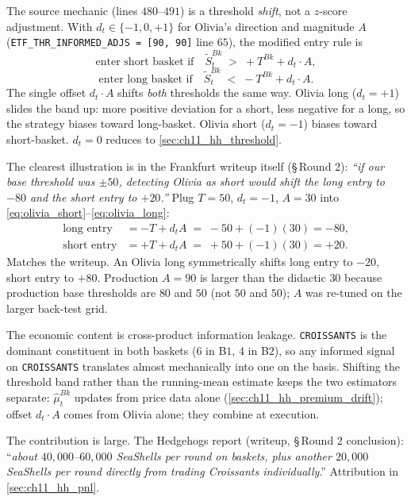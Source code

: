 The source mechanic (lines $480$--$491$) is a threshold
\emph{shift}, not a $z$-score adjustment. With
$d_t \in \{-1, 0, +1\}$ for Olivia's direction and magnitude $A$
(\texttt{ETF\_THR\_INFORMED\_ADJS = [90, 90]} line $65$), the
modified entry rule is
\begin{equation}
  \text{enter short basket if}\quad
    \tilde S^{Bk}_t \;>\; +T^{Bk} + d_t \cdot A,
  \label{eq:olivia_short}
\end{equation}
\begin{equation}
  \text{enter long basket if}\quad
    \tilde S^{Bk}_t \;<\; -T^{Bk} + d_t \cdot A.
  \label{eq:olivia_long}
\end{equation}
The single offset $d_t \cdot A$ shifts \emph{both} thresholds the
same way. Olivia long ($d_t = +1$) slides the band up: more
positive deviation for a short, less negative for a long, so the
strategy biases toward long-basket. Olivia short ($d_t = -1$)
biases toward short-basket. $d_t = 0$ reduces to
\cref{sec:ch11_hh_threshold}.

\begin{prosperitybox}[title={Prosperity example: the Olivia cross-product adjustment}]
\label{prosp:olivia}
The clearest illustration is in the Frankfurt writeup itself
(\S\,Round 2): \emph{``if our base threshold was $\pm 50$,
detecting Olivia as short would shift the long entry to $-80$
and the short entry to $+20$.''} Plug $T = 50$, $d_t = -1$,
$A = 30$ into \eqref{eq:olivia_short}--\eqref{eq:olivia_long}:
\begin{align*}
  \text{long entry}  &= -T + d_t A \;=\; -50 + (-1)(30) = -80,\\
  \text{short entry} &= +T + d_t A \;=\; +50 + (-1)(30) = +20.
\end{align*}
Matches the writeup. An Olivia long symmetrically shifts long
entry to $-20$, short entry to $+80$. Production $A = 90$ is
larger than the didactic $30$ because production base thresholds
are $80$ and $50$ (not $50$ and $50$); $A$ was re-tuned on the
larger back-test grid.

The economic content is cross-product information leakage.
\texttt{CROISSANTS} is the dominant constituent in both baskets
($6$ in B$1$, $4$ in B$2$), so any informed signal on
\texttt{CROISSANTS} translates almost mechanically into one on the
basis. Shifting the threshold band rather than the running-mean
estimate keeps the two estimators separate: $\hat\mu^{Bk}_t$
updates from price data alone
(\cref{sec:ch11_hh_premium_drift}); offset $d_t \cdot A$ comes
from Olivia alone; they combine at execution.

The contribution is large. The Hedgehogs report (writeup,
\S\,Round 2 conclusion): ``\emph{about $40{,}000$--$60{,}000$
SeaShells per round on baskets, plus another $20{,}000$ SeaShells
per round directly from trading Croissants individually}.''
Attribution in \cref{sec:ch11_hh_pnl}.
\end{prosperitybox}

